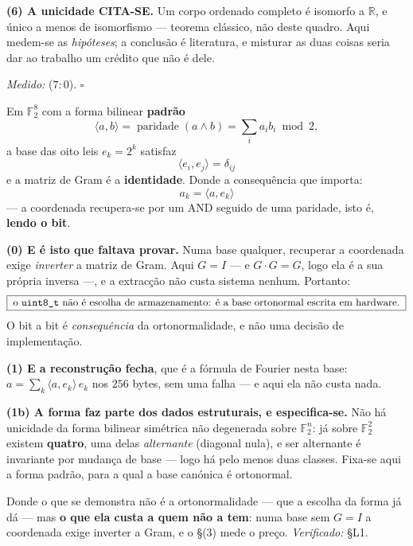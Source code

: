 \documentclass[livro.tex]{subfiles}
\begin{document}
\begin{teorema}
\textbf{(6) A unicidade CITA-SE.} Um corpo ordenado completo é isomorfo a
$\mathbb{R}$, e único a menos de isomorfismo --- teorema clássico, não
deste quadro. Aqui medem-se as \emph{hipóteses}; a conclusão é
literatura, e misturar as duas coisas seria dar ao trabalho um crédito
que não é dele.

\emph{Medido:}  ($7{:}0$). $\square$
\end{teorema}

\begin{teorema}\label{thm:ortonormal}
Em $\mathbb{F}_2^{8}$ com a forma bilinear \textbf{padrão}
\[
\langle a,b\rangle=\operatorname{paridade}(a\wedge b)
=\textstyle\sum_i a_ib_i \bmod 2 ,
\]
a base das oito leis $e_k=2^{k}$ satisfaz
\[
\boxed{\;\langle e_i,e_j\rangle=\delta_{ij}\;}
\]
e a matriz de Gram é a \textbf{identidade}. Donde a consequência que
importa:
\[
\boxed{\;a_k=\langle a,e_k\rangle\;}
\]
--- a coordenada recupera-se por um AND seguido de uma paridade, isto é,
\textbf{lendo o bit}.

\textbf{(0) E é isto que faltava provar.} Numa base qualquer, recuperar a
coordenada exige \emph{inverter} a matriz de Gram. Aqui $G=I$ --- e
$G\cdot G=G$, logo ela é a sua própria inversa ---, e a extracção não
custa sistema nenhum. Portanto:
\[
\boxed{\;\text{o \texttt{uint8\_t} não é escolha de armazenamento: é a
base ortonormal escrita em hardware.}\;}
\]
O bit a bit é \emph{consequência} da ortonormalidade, e não uma decisão
de implementação.

\textbf{(1) E a reconstrução fecha}, que é a fórmula de Fourier nesta
base: $a=\sum_k\langle a,e_k\rangle\,e_k$ nos $256$ bytes, sem uma falha
--- e aqui ela não custa nada.

\textbf{(1b) A forma faz parte dos dados estruturais, e especifica-se.} Não há
unicidade da forma bilinear simétrica não degenerada sobre $\mathbb{F}_2^{n}$: já
sobre $\mathbb{F}_2^{2}$ existem \textbf{quatro}, uma delas \emph{alternante}
(diagonal nula), e ser alternante é invariante por mudança de base --- logo há
pelo menos duas classes. Fixa-se aqui a forma padrão, para a qual a base canónica
é ortonormal.

Donde o que se demonstra não é a ortonormalidade --- que a escolha da forma já dá
--- mas \textbf{o que ela custa a quem não a tem}: numa base sem $G=I$ a
coordenada exige inverter a Gram, e o \S(3) mede o preço.
\emph{Verificado:}  \S L1.


\end{teorema}
\end{document}
